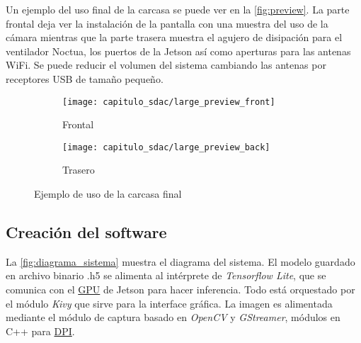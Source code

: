 Un ejemplo del uso final de la carcasa se puede ver en la \autoref{fig:preview}.
La parte frontal deja ver la instalación de la pantalla con una muestra del uso
de la cámara mientras que la parte trasera muestra el agujero de disipación para
el ventilador Noctua, los puertos de la Jetson así como aperturas para las
antenas WiFi. Se puede reducir el volumen del sistema cambiando las antenas por
receptores USB de tamaño pequeño.

\begin{figure}[H]
    \centering
    \begin{subfigure}{.5\textwidth}
        \centering
        \texttt{[image: capitulo\_sdac/large\_preview\_front]}
        \caption{Frontal}
    \end{subfigure}%
    \begin{subfigure}{.5\textwidth}
        \centering
        \texttt{[image: capitulo\_sdac/large\_preview\_back]}
        \caption{Trasero}
    \end{subfigure}
    \caption{Ejemplo de uso de la carcasa final}
    \label{fig:preview}
\end{figure}

\subsection{Creación del software}

La \autoref{fig:diagrama_sistema} muestra el diagrama del sistema. El modelo
guardado en archivo binario .h5 se alimenta al intérprete de \emph{Tensorflow
Lite}, que se comunica con el \hyperlink{abbr}{GPU} de Jetson para hacer
inferencia. Todo está orquestado por el módulo \emph{Kivy} que sirve para la
interface gráfica. La imagen es alimentada mediante el módulo de captura basado
en \emph{OpenCV} y \emph{GStreamer}, módulos en C++ para \hyperlink{abbr}{DPI}.

